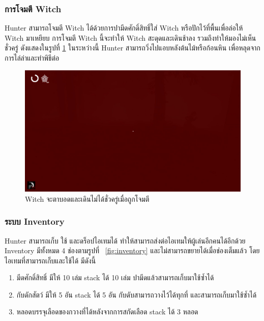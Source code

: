 \subsubsection{การโจมตี Witch}

Hunter สามารถโจมตี Witch ได้ด้วยการปามีดศักดิ์สิทธิ์ใส่ Witch หรือปักไว้ที่พื้นเพื่อล่อให้ Witch มาเหยียบ การโจมตี Witch นี้จะทำให้ Witch สะดุดและเดินช้าลง 
รวมถึงทำให้มองไม่เห็นชั่วครู่ ดังแสดงในรูปที่ \ref{fig:blind} ในระหว่างนี้ Hunter สามารถวิ่งไปแอบหลังต้นไม้หรือก้อนหิน เพื่อหลุดจากการไล่ล่าและทำพิธีต่อ

\begin{figure}[h]
  \begin{center}
  \includegraphics[width=\textwidth]{./img/mechanics/witch_blind.png}
  \end{center}
  \caption[Witch จะตาบอดและเดินไม่ได้ชั่วครู่เมื่อถูกโจมตี]{Witch จะตาบอดและเดินไม่ได้ชั่วครู่เมื่อถูกโจมตี}
  \label{fig:blind}
\end{figure}

\subsubsection{ระบบ Inventory}

Hunter สามารถเก็บ ใช้ และดร็อปไอเทมได้ ทำให้สามารถส่งต่อไอเทมให้ผู้เล่นอีกคนได้อีกด้วย Inventory มีทั้งหมด 4 ช่องตามรูปที่ ~\ref{fig:inventory} และไม่สามารถขยายได้เมื่อช่องเต็มแล้ว
โดยไอเทมที่สามารถเก็บและใช้ได้ มีดังนี้
\begin{enumerate}
  \item มีดศักดิ์สิทธิ์ มีให้ 10 เล่ม stack ได้ 10 เล่ม ปามีดแล้วสามารถเก็บมาใช้ซ้ำได้
  \item กับดักสัตว์ มีให้ 5 อัน stack ได้ 5 อัน กับดับสามารถวางไว้ได้ทุกที่ และสามารถเก็บมาใช้ซ้ำได้
  \item หลอดบรรจุเลือดของกวางที่ได้หลังจากการสกัดเลือด stack ได้ 3 หลอด
\end{enumerate}

